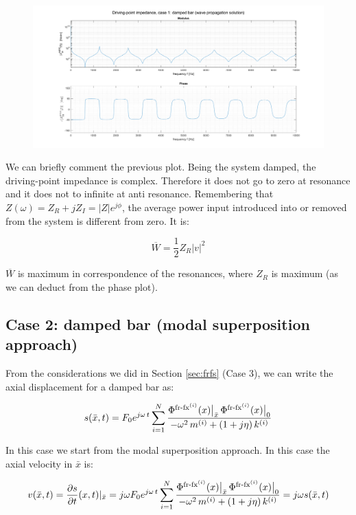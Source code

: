 \documentclass[a4paper,12pt,oneside]{article}
\begin{document}
\begin{figure}[h]
	\hspace{-70pt}
	\includegraphics[scale=0.4]{impedance_wave_propagation_solution}
\end{figure}

We can briefly comment the previous plot. Being the system damped, the driving-point impedance is complex. Therefore it does not go to zero at resonance and it does not to infinite at anti resonance.
Remembering that $Z(\omega) = Z_R +jZ_I = |Z|e^{j\phi}$, the average power input introduced into or removed from the system is different from zero. It is:

\[
\overline{W} = \frac{1}{2} Z_R |v|^2 
\]

$\overline{W}$ is maximum in correspondence of the resonances, where $Z_R$ is maximum (as we can deduct from the phase plot).

\subsection*{Case 2: damped bar (modal superposition approach)}

From the considerations we did in Section \ref{sec:frfs} (Case 3), we can write the axial displacement for a damped bar as:

\[ \begin{split}
	s(\bar{x}, t) = 
		F_0 e^{j \omega \, t}
		\sum_{i=1}^N \frac{\Phi^{\textup{fr-fx}^{(i)}}(x)\big|_{\bar{x}} \,
		\Phi^{\textup{fr-fx}^{(i)}}(x)\big|_0 }
		{-\omega^2 \, m^{(i)} + (1 + j \eta) \, k^{(i)}}
\end{split} \]

In this case we start from the modal superposition approach. In this case the axial velocity in $\bar{x}$ is:

\[
v(\bar{x},t) = \frac{\partial s}{\partial t} (x,t) \vert_{\bar{x}} =
j \omega  
F_0 e^{j \omega \, t}
		\sum_{i=1}^N \frac{\Phi^{\textup{fr-fx}^{(i)}}(x)\big|_{\bar{x}} \,
		\Phi^{\textup{fr-fx}^{(i)}}(x)\big|_0 }
		{-\omega^2 \, m^{(i)} + (1 + j \eta) \, k^{(i)}} = 
j \omega s(\bar{x},t)
\]
\end{document}
